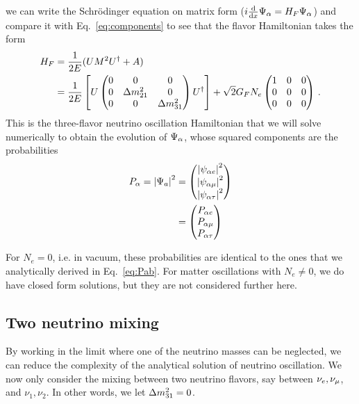 we can write the Schrödinger equation on matrix form ($i \dv{}{x}\Psi_\alpha = H_F \Psi_\alpha$) and compare it with Eq.~\ref{eq:components} to see that the flavor Hamiltonian takes the form 
\begin{align}\label{eq:H_3gen}
    H_F &= \frac{1}{2E}(U M^2 U^\dagger + A) \nonumber \\
        &= \frac{1}{2E}\left[U \begin{pmatrix}
            0 & 0 & 0 \\
            0 & \dm_{21} & 0 \\
            0 & 0 & \dm_{31}
        \end{pmatrix} U^\dagger\right] + \sqrt{2}G_F N_e \begin{pmatrix}
            1 & 0 & 0 \\
            0 & 0 & 0 \\
            0 & 0 & 0
        \end{pmatrix}\,. 
\end{align}
This is the three-flavor neutrino oscillation Hamiltonian that we will solve numerically to obtain the evolution of $\Psi_\alpha$, whose squared components
are the probabilities
\begin{align}
    P_\alpha = \abs{\Psi_a}^2 &=\begin{pmatrix}
        \abs{\psi_{\alpha e}}^2 \\
        \abs{\psi_{\alpha \mu}}^{2} \\
        \abs{\psi_{\alpha \tau}}^{2}
    \end{pmatrix} \nonumber \\
    &=\begin{pmatrix}
        P_{\alpha e} \\
        P_{\alpha \mu} \\
        P_{\alpha \tau}
    \end{pmatrix} 
\end{align}

For $N_e = 0$, i.e. in vacuum, these probabilities are identical to the ones that we analytically derived in Eq.~\ref{eq:Pab}.
For matter oscillations with $N_e \neq 0$, we do have closed form solutions, but they are not considered further here. 

\subsection{Two neutrino mixing}
By working in the limit where one of the neutrino masses can be neglected, 
we can reduce the complexity of the analytical solution of neutrino oscillation. We now only consider the mixing between two neutrino flavors, say between $\nu_e, \nu_\mu$, and $\nu_1, \nu_2$. In other words, we let $\dm[31] = 0$.

